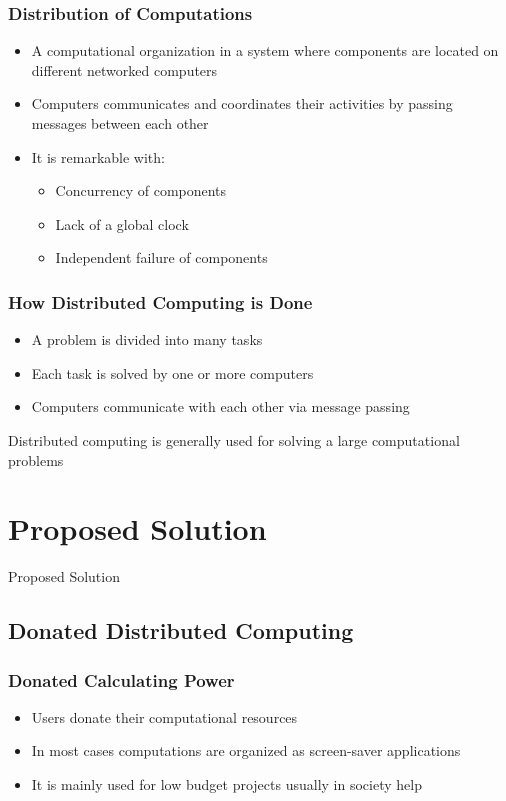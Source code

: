 \documentclass{beamer}
\begin{document}
\begin{frame}
\frametitle{Distribution of Computations}
\begin{itemize}
	\item A computational organization in a system where components are located on different networked computers
	\item Computers communicates and coordinates their activities by passing messages between each other
	\item It is remarkable with:
	\begin{itemize}
		\item Concurrency of components
		\item Lack of a global clock
		\item Independent failure of components
	\end{itemize}
\end{itemize}
\end{frame}

\begin{frame}
\frametitle{How Distributed Computing is Done}
\begin{itemize}
	\item A problem is divided into many tasks
	\item Each task is solved by one or more computers
	\item Computers communicate with each other via message passing
\end{itemize}
{\color{red} Distributed computing is generally used for solving a large computational problems}
\end{frame}

\section{Proposed Solution}

\begin{frame}
\center \huge{Proposed Solution}
\end{frame}

\subsection{Donated Distributed Computing}

\begin{frame}
\frametitle{Donated Calculating Power}
\begin{itemize}
	\item Users donate their computational resources
	\item In most cases computations are organized as screen-saver applications
	\item It is mainly used for low budget projects usually in society help
\end{itemize}
\end{frame}
\end{document}
